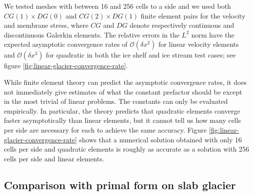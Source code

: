\documentclass[review,oneside]{igs}
\begin{document}
We tested meshes with between 16 and 256 cells to a side and we used both $CG(1) \times DG(0)$ and $CG(2) \times DG(1)$ finite element pairs for the velocity and membrane stress, where $CG$ and $DG$ denote respectively continuous and discontinuous Galerkin elements.
The relative errors in the $L^2$ norm have the expected asymptotic convergence rates of $\mathscr{O}(\delta x^2)$ for linear velocity elements and $\mathscr{O}(\delta x^3)$ for quadratic in both the ice shelf and ice stream test cases; see figure \ref{fig:linear-glacier-convergence-rate}.

While finite element theory can predict the asymptotic convergence rates, it does not immediately give estimates of what the constant prefactor should be except in the most trivial of linear problems.
The constants can only be evaluated empirically.
In particular, the theory predicts that quadratic elements converge faster asymptotically than linear elements, but it cannot tell us how many cells per side are necessary for each to achieve the same accuracy.
Figure \ref{fig:linear-glacier-convergence-rate} shows that a numerical solution obtained with only 16 cells per side and quadratic elements is roughly as accurate as a solution with 256 cells per side and linear elements.


\subsection{Comparison with primal form on slab glacier}
\end{document}
